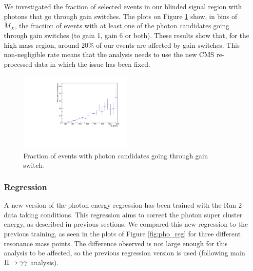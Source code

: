 We investigated the fraction of selected events in our blinded signal region with photons that go through gain switches. 
The plots on Figure \ref{fig:gain_switch}  show, in bins of $\tilde{M}_{X}$, the fraction of events with at least one of the photon candidates going through gain switches (to gain 1, gain 6 or both). 
These results show that, for the high mass region, around $20\%$ of our events are affected by gain switches. 
This non-negligible rate means that the analysis needs to use the new CMS re-processed data in which the issue has been fixed.

\begin{figure}[thb]
  \centering
  \includegraphics[width=0.5\textwidth]{figures/sec-photons/rg16}
  \caption{Fraction of events with photon candidates going through gain switch.}
  \label{fig:gain_switch}
\end{figure}

\subsubsection{Regression}

A new version of the photon energy regression has been trained with the Run 2 data taking conditions. 
This regression aims to correct the photon super cluster energy, as described in previous sections.  
We compared this new regression to the previous training, as seen in the plots of Figure \ref{fig:pho_reg} for three different resonance mass points. 
The difference observed is not large enough for this analysis to be affected, so the previous regression version is used (following main $\mathrm{H}\to\gamma\gamma$ analysis).

